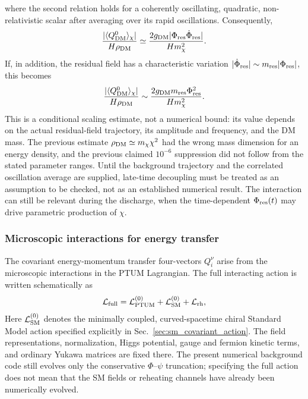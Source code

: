 \documentclass[epj]{svjour}
\begin{document}
where the second relation holds for a coherently oscillating,
quadratic, non-relativistic scalar after averaging over its rapid
oscillations. Consequently,
\begin{equation}
\frac{|\langle Q_{\rm DM}^{0}\rangle_\chi|}
{H\rho_{\rm DM}}
\simeq
\frac{2g_{\rm DM}|\Phi_{\rm res}
\dot\Phi_{\rm res}|}{H m_\chi^2}.
\label{eq:dmde_transfer_ratio}
\end{equation}
If, in addition, the residual field has a characteristic variation
\(|\dot\Phi_{\rm res}|\sim m_{\rm res}|\Phi_{\rm res}|\),
this becomes
\begin{equation}
\frac{|\langle Q_{\rm DM}^{0}\rangle_\chi|}
{H\rho_{\rm DM}}
\sim
\frac{2g_{\rm DM}m_{\rm res}\Phi_{\rm res}^{2}}
{H m_\chi^{2}}.
\end{equation}
This is a conditional scaling estimate, not a numerical bound:
its value depends on the actual residual-field trajectory, its
amplitude and frequency, and the DM mass. The previous estimate
\(\rho_{\rm DM}\simeq m_\chi\chi^2\) had the wrong mass
dimension for an energy density, and the previous claimed
\(10^{-6}\) suppression did not follow from the stated parameter
ranges. Until the background trajectory and the correlated
oscillation average are supplied, late-time decoupling must be treated
as an assumption to be checked, not as an established numerical
result. The interaction can still be relevant during the discharge,
when the time-dependent \(\Phi_{\rm res}(t)\) may drive
parametric production of \(\chi\).

\subsubsection{Microscopic interactions for energy transfer}
\label{sec:microscopic_transfer}

The covariant energy-momentum transfer four-vectors $Q_i^\nu$ arise
from the microscopic interactions in the PTUM Lagrangian. The full interacting action is written schematically as
\begin{equation}
\mathcal{L}_{\rm full}
=\mathcal{L}_{\rm PTUM}^{(0)}
+\mathcal{L}_{\rm SM}^{(0)}
+\mathcal{L}_{\rm rh},
\end{equation}
Here \(\mathcal{L}_{\rm SM}^{(0)}\) denotes the minimally coupled,
curved-spacetime chiral Standard Model action specified explicitly in
Sec.~\ref{sec:sm_covariant_action}. The field representations,
normalization, Higgs potential, gauge and fermion kinetic terms, and
ordinary Yukawa matrices are fixed there. The present numerical
background code still evolves only the conservative \(\Phi\)--\(\psi\)
truncation; specifying the full action does not mean that the SM
fields or reheating channels have already been numerically evolved.
\end{document}
